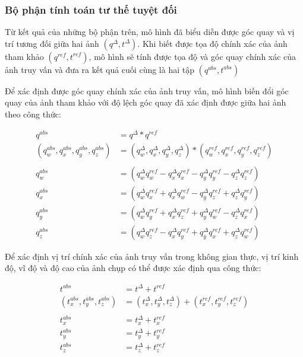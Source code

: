 \subsubsection{Bộ phận tính toán tư thế tuyệt đối}

Từ kết quả của những bộ phận trên, mô hình đã biểu diễn được góc quay và vị trí tương đối giữa hai ảnh $(q^{\Delta},t^{\Delta})$. Khi biết được tọa độ chính xác của ảnh tham khảo $(q^{ref},t^{ref})$, mô hình sẽ tính được tọa độ và góc quay chính xác của ảnh truy vấn và đưa ra kết quả cuối cùng là hai tập $(q^{abs},t^{abs})$

Để xác định được góc quay chính xác của ảnh truy vấn, mô hình biến đổi góc quay của ảnh tham khảo với độ lệch góc quay đã xác định được giữa hai ảnh theo công thức:

$$
  \begin{aligned}
    q^{abs}                                   & = q^{\Delta} * q^{ref}                                                                                    \\
    (q^{abs}_w,q^{abs}_x,q^{abs}_y,q^{abs}_z) & = (q^{\Delta}_w,q^{\Delta}_x,q^{\Delta}_y,q^{\Delta}_z) * (q^{ref}_w,q^{ref}_x,q^{ref}_y,q^{ref}_z)       \\ \\
    q^{abs}_w                                 & =\left(q^{\Delta}_w q^{ref}_w-q^{\Delta}_x q^{ref}_x-q^{\Delta}_y q^{ref}_y-q^{\Delta}_z q^{ref}_z\right) \\
    q^{abs}_x                                 & =\left(q^{\Delta}_w q^{ref}_x+q^{\Delta}_x q^{ref}_w-q^{\Delta}_y q^{ref}_z+q^{\Delta}_z q^{ref}_y\right) \\
    q^{abs}_y                                 & =\left(q^{\Delta}_w q^{ref}_y+q^{\Delta}_x q^{ref}_z+q^{\Delta}_y q^{ref}_w-q^{\Delta}_z q^{ref}_x\right) \\
    q^{abs}_z                                 & =\left(q^{\Delta}_w q^{ref}_z-q^{\Delta}_x q^{ref}_y+q^{\Delta}_y q^{ref}_x+q^{\Delta}_z q^{ref}_w\right)
  \end{aligned}
$$

Để xác định vị trí chính xác của ảnh truy vấn trong không gian thực, vị trí kinh độ, vĩ độ và độ cao của ảnh chụp có thể được xác định qua công thức:

$$
  \begin{aligned}
    t^{abs}                         & = t^{\Delta} + t^{ref}                                                       \\
    (t^{abs}_x,t^{abs}_y,t^{abs}_z) & = (t^{\Delta}_x,t^{\Delta}_y,t^{\Delta}_z) + (t^{ref}_x,t^{ref}_y,t^{ref}_z) \\ \\
    t^{abs}_x                       & = t^{\Delta}_x + t^{ref}_x                                                   \\
    t^{abs}_y                       & = t^{\Delta}_y + t^{ref}_y                                                   \\
    t^{abs}_z                       & = t^{\Delta}_z + t^{ref}_z                                                   \\
  \end{aligned}
$$


